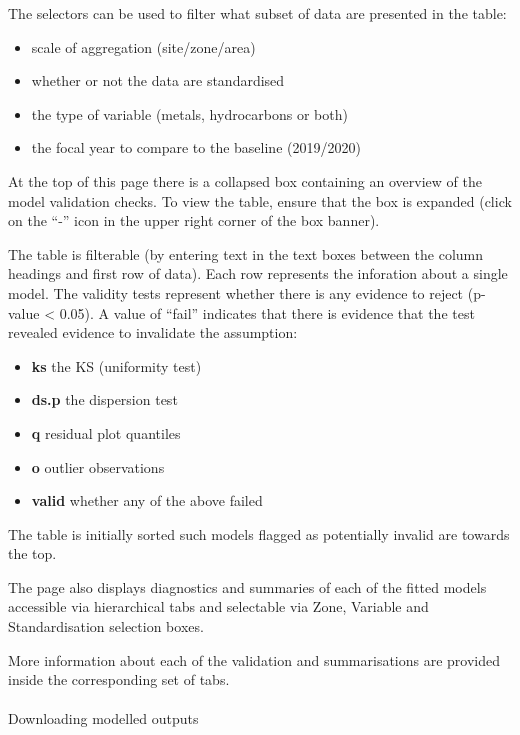 \documentclass[
  8pt,
  a4paper]{article}
\makeatletter
\let\oldparagraph\paragraph
\renewcommand{\paragraph}{
    \@ifstar
      \xxxParagraphStar
      \xxxParagraphNoStar
  }
\newcommand{\xxxParagraphStar}[1]{\oldparagraph*{#1}\mbox{}}
\newcommand{\xxxParagraphNoStar}[1]{\oldparagraph{#1}\mbox{}}
\providecommand{\tightlist}{%
  \setlength{\itemsep}{0pt}\setlength{\parskip}{0pt}}\usepackage{longtable,booktabs,array}
\makeatother
\begin{document}
The selectors can be used to filter what subset of data are presented in
the table:

\begin{itemize}
\tightlist
\item
  scale of aggregation (site/zone/area)
\item
  whether or not the data are standardised
\item
  the type of variable (metals, hydrocarbons or both)
\item
  the focal year to compare to the baseline (2019/2020)
\end{itemize}

At the top of this page there is a collapsed box containing an overview
of the model validation checks. To view the table, ensure that the box
is expanded (click on the ``-'' icon in the upper right corner of the
box banner).

The table is filterable (by entering text in the text boxes between the
column headings and first row of data). Each row represents the
inforation about a single model. The validity tests represent whether
there is any evidence to reject (p-value \textless{} 0.05). A value of
``fail'' indicates that there is evidence that the test revealed
evidence to invalidate the assumption:

\begin{itemize}
\tightlist
\item
  \textbf{ks} the KS (uniformity test)
\item
  \textbf{ds.p} the dispersion test
\item
  \textbf{q} residual plot quantiles
\item
  \textbf{o} outlier observations
\item
  \textbf{valid} whether any of the above failed
\end{itemize}

The table is initially sorted such models flagged as potentially invalid
are towards the top.

The page also displays diagnostics and summaries of each of the fitted
models accessible via hierarchical tabs and selectable via Zone,
Variable and Standardisation selection boxes.

More information about each of the validation and summarisations are
provided inside the corresponding set of tabs.

\paragraph{Downloading modelled
outputs}\label{downloading-modelled-outputs}
\end{document}
